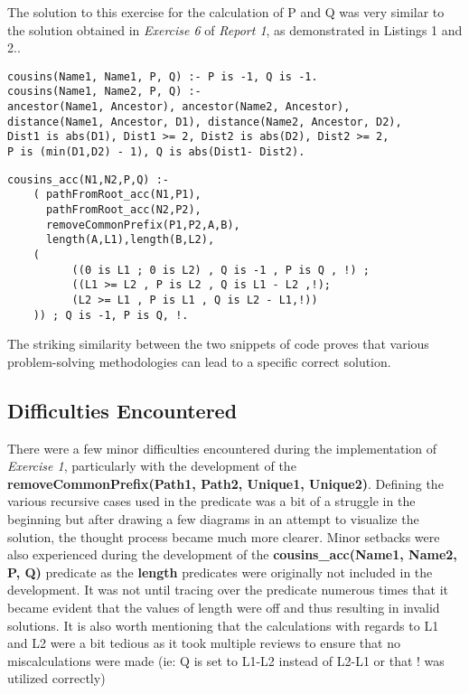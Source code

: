\documentclass[11pt]{article}
\newcommand{\forceindent}{\leavevmode{\parindent=1em\indent}}
\begin{document}
The solution to this exercise for the calculation of P and Q was very similar to the solution obtained in \emph{Exercise 6} of \emph{Report 1}, as demonstrated in Listings 1 and 2..
\begin{lstlisting}[caption= Exercise 6 Report 1, label= Listing 1]
cousins(Name1, Name1, P, Q) :- P is -1, Q is -1.
cousins(Name1, Name2, P, Q) :- 
ancestor(Name1, Ancestor), ancestor(Name2, Ancestor),
distance(Name1, Ancestor, D1), distance(Name2, Ancestor, D2), 
Dist1 is abs(D1), Dist1 >= 2, Dist2 is abs(D2), Dist2 >= 2,
P is (min(D1,D2) - 1), Q is abs(Dist1- Dist2).	
\end{lstlisting}

\begin{lstlisting}[caption= Exercise 1 Report 3, label= Listing 2]
cousins_acc(N1,N2,P,Q) :- 
    ( pathFromRoot_acc(N1,P1),  
	  pathFromRoot_acc(N2,P2),  
	  removeCommonPrefix(P1,P2,A,B),               
      length(A,L1),length(B,L2),    
    (                                                          
          ((0 is L1 ; 0 is L2) , Q is -1 , P is Q , !) ;  
          ((L1 >= L2 , P is L2 , Q is L1 - L2 ,!);   
          (L2 >= L1 , P is L1 , Q is L2 - L1,!))
    )) ; Q is -1, P is Q, !. 
\end{lstlisting}

The striking similarity between the two snippets of code proves that various problem-solving methodologies can lead to a specific correct solution.		 	 	
	\subsection{Difficulties Encountered}
\forceindent There were a few minor difficulties encountered during the implementation of  \emph{Exercise 1}, particularly with the development of the \textbf{removeCommonPrefix(Path1, Path2, Unique1, Unique2)}. Defining the various recursive cases used in the predicate was a bit of a struggle in the beginning but after drawing a few diagrams in an attempt to visualize the solution, the thought process became much more clearer. Minor setbacks were also experienced during the development of the \textbf{cousins\_acc(Name1, Name2, P, Q)} predicate as the \textbf{length} predicates were originally not included in the development. It was not until tracing over the predicate numerous times that it became evident that the values of length were off and thus resulting in invalid solutions. It is also worth mentioning that the calculations with regards to L1 and L2 were a bit tedious as it took multiple reviews to ensure that no miscalculations were made (ie: Q is set to L1-L2 instead of L2-L1 or that ! was utilized correctly)
	
\end{document}
